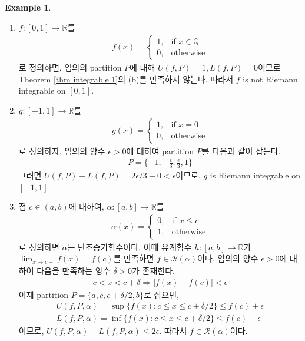 \documentclass[12pt]{article}
\theoremstyle{definition}
\newtheorem*{ex}{Example}
\def\QQ{\mathbb{Q}}
\def\RR{\mathbb{R}}
\def\eps{\epsilon}
\def\calR{\mathcal{R}}
\newcommand{\abs}[1]{\left\vert#1\right\vert}
\begin{document}
\begin{ex}
	\quad
	\begin{enumerate}[label=(\alph*), leftmargin=2\parindent]
		\item
		\(f: [0, 1] \rightarrow \RR\)를
		\begin{gather*}
			f(x) =
			\begin{cases}
				1, &\text{if } x \in \QQ\\
				0, &\text{otherwise}
			\end{cases}
		\end{gather*}
		로 정의하면, 임의의 partition \(P\)에 대해 \(U(f, P) = 1, L(f, P) = 0\)이므로 Theorem \ref{thm integrable 1}의 (b)를 만족하지 않는다. 따라서 \(f\) is not Riemann integrable on \([0, 1]\).
		\item
		\(g: [-1, 1] \rightarrow \RR\)를
		\begin{gather*}
			g(x) =
			\begin{cases}
				1, &\text{if } x = 0\\
				0, &\text{otherwise}
			\end{cases}
		\end{gather*}
		로 정의하자. 임의의 양수 \(\eps > 0\)에 대하여 partition \(P\)를 다음과 같이 잡는다.
		\begin{gather*}
			P = \{-1, -\frac{\eps}{3}, \frac{\eps}{3}, 1\}
		\end{gather*}
		그러면 \(U(f, P) - L(f, P) = 2\eps/3 - 0 < \eps\)이므로, \(g\) is Riemann integrable on \([-1, 1]\).
		\item
		점 \(c \in (a, b)\)에 대하여, \(\alpha: [a, b] \rightarrow \RR\)를
		\begin{gather*}
			\alpha(x) =
			\begin{cases}
				0, &\text{if } x \le c\\
				1, &\text{otherwise}
			\end{cases}
		\end{gather*}
		로 정의하면 \(\alpha\)는 단조증가함수이다. 이때 유계함수 \(h: [a, b] \rightarrow \RR\)가 \(\lim_{x \rightarrow c+} f(x) = f(c)\)를 만족하면 \(f \in \calR(\alpha)\)이다. 임의의 양수 \(\eps > 0\)에 대하여 다음을 만족하는 양수 \(\delta > 0\)가 존재한다.
		\begin{gather*}
			c < x < c+\delta \Longrightarrow \abs{f(x) - f(c)} < \eps
		\end{gather*}
		이제 partition \(P = \{a, c, c+\delta/2, b\}\)로 잡으면,
		\begin{gather*}
			U(f, P, \alpha) = \sup\{f(x): c\le x \le c+ \delta/2 \} \le f(c) + \eps\\
			L(f, P, \alpha) = \inf\{f(x): c\le x \le c+ \delta/2 \} \le f(c) - \eps
		\end{gather*}
		이므로, \(U(f, P, \alpha) - L(f, P, \alpha) \le 2\eps\). 따라서 \(f \in \calR(\alpha)\)이다.
	\end{enumerate}
\end{ex}
\end{document}
